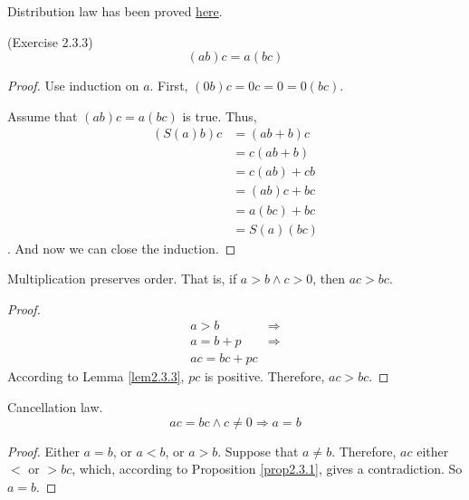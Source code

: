 Distribution law has been proved \hyperref[distriLaw]{here}.

\begin{prop}
(Exercise 2.3.3) \label{exercise2.3.3}
\[
(ab)c = a(bc)
\]
\end{prop}
\begin{proof}
Use induction on $a$.
First, $(0b)c=0c=0=0(bc)$.

Assume that $(ab)c = a(bc)$ is true. Thus, 
\begin{align*}
(S(a)b)c
&= (ab+b)c \\
&= c(ab+b) \tag{Commutativity} \\
&= c(ab) + cb \tag{Distribution law} \\
&= (ab)c + bc \tag{Commutativity} \\
&= a(bc) + bc \tag{The induction hypothesis} \\
&= S(a)(bc)
\end{align*}. And now we can close the induction.
\end{proof}

\begin{prop}
\label{prop2.3.1}
Multiplication preserves order. That is, if $a>b \wedge c>0$, then $ac > bc$.
\end{prop}
\begin{proof}
\begin{align*}
a>b 
&\Longrightarrow \\ a = b + p 
&\Longrightarrow \\ ac = bc + pc
\end{align*}
According to Lemma \ref{lem2.3.3}, $pc$ is positive. Therefore, $ac>bc$.
\end{proof}

\begin{coro}
Cancellation law. 
\[
ac=bc \wedge c \neq 0 \Longrightarrow a=b
\]
\end{coro}
\begin{proof}
Either $a=b$, or $a<b$, or $a>b$. Suppose that $a \neq b$. Therefore, $ac$ either $<$ or $>bc$, which, 
according to Proposition \ref{prop2.3.1}, gives a contradiction. So $a=b$.
\end{proof}

